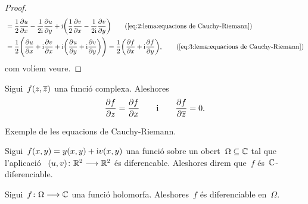\documentclass[../Apunts.tex]{subfiles}
\begin{document}
\begin{proof}
\begin{align*}
			&=\frac{1}{2}\frac{\partial u}{\partial x}
			-\frac{1}{2\iu}\frac{\partial u}{\partial y}
			+\iu\biggl(\frac{1}{2}\frac{\partial v}{\partial x}
			-\frac{1}{2\iu}\frac{\partial v}{\partial y}\biggr)
			\tag{\ref{eq:2:lema:equacions de Cauchy-Riemann}}\\
			&=\frac{1}{2}\Biggl(\frac{\partial u}{\partial x}
			+\iu\frac{\partial v}{\partial x}+\iu\biggl(\frac{\partial u}{\partial y}
			+\iu\frac{\partial v}{\partial y}\biggr)\Biggr)
			=\frac{1}{2}\biggl(\frac{\partial f}{\partial x}
			+\iu\frac{\partial f}{\partial y}\biggr),
			\tag{\ref{eq:3:lema:equacions de Cauchy-Riemann}}
		\end{align*}
		com volíem veure.
	\end{proof}
	\begin{observation}
		Sigui~\(f(z,\overline{z})\) una funció complexa.
		Aleshores
		\[
			\frac{\partial f}{\partial z}=\frac{\partial f}{\partial x}
			\qquad\text{i}\qquad
			\frac{\partial f}{\partial\overline{z}}=0.
		\]
	\end{observation}
	\begin{example}
		Exemple de les equacions de Cauchy-Riemann.
	\end{example}
	\begin{solution}
	\end{solution}
	\begin{definition}
		\label{def:C-diferenciable}
		Sigui~\(f(x,y)=y(x,y)+\mathrm{i} v(x,y)\) una funció sobre un
		obert~\(\Omega\subseteq\mathbb{C}\) tal que l'aplicació%
		~\((u,v)\colon\mathbb{R}^{2}\longrightarrow\mathbb{R}^{2}\) és diferencable.
		Aleshores direm que~\(f\) és~\(\mathbb{C}\)-diferenciable.
	\end{definition}
	\begin{proposition}
		\label{prop:les funcions holomorfes són funcions diferenciables}
		Sigui~\(f\colon\Omega\longrightarrow\mathbb{C}\) una funció holomorfa.
		Aleshores~\(f\) és diferenciable en~\(\Omega\).
	\end{proposition}
\end{document}
